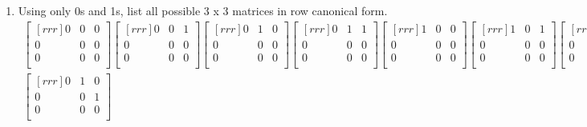 \documentclass[12pt]{article}
\begin{document}
\begin{enumerate}
\item [2.89.] Using only 0s and 1s, list all possible 3 x 3 matrices in row canonical form.
\begin{align*}
\begin{bmatrix}[rrr]
0 & 0 & 0\\
0 & 0 & 0\\
0 & 0 & 0\\
\end{bmatrix}
\begin{bmatrix}[rrr]
0 & 0 & 1\\
0 & 0 & 0\\
0 & 0 & 0\\
\end{bmatrix}
\begin{bmatrix}[rrr]
0 & 1 & 0\\
0 & 0 & 0\\
0 & 0 & 0\\
\end{bmatrix}
\begin{bmatrix}[rrr]
0 & 1 & 1\\
0 & 0 & 0\\
0 & 0 & 0\\
\end{bmatrix}
\begin{bmatrix}[rrr]
1 & 0 & 0\\
0 & 0 & 0\\
0 & 0 & 0\\
\end{bmatrix}
\begin{bmatrix}[rrr]
1 & 0 & 1\\
0 & 0 & 0\\
0 & 0 & 0\\
\end{bmatrix}
\begin{bmatrix}[rrr]
1 & 1 & 0\\
0 & 0 & 0\\
0 & 0 & 0\\
\end{bmatrix}
\begin{bmatrix}[rrr]
1 & 1 & 1\\
0 & 0 & 0\\
0 & 0 & 0\\
\end{bmatrix}\\
%
\begin{bmatrix}[rrr]
0 & 1 & 0\\
0 & 0 & 1\\
0 & 0 & 0\\

\end{bmatrix}
\end{align*}
\end{enumerate}
\end{document}

